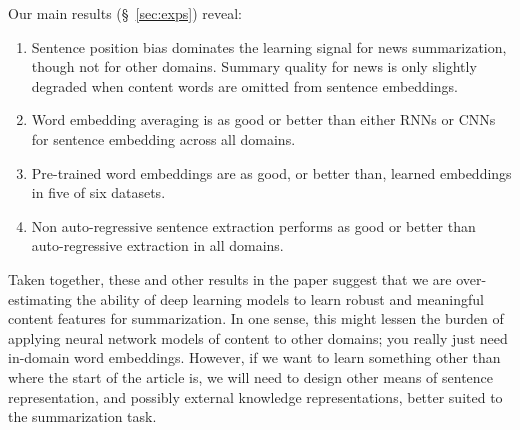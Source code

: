 \noindent
Our main results (\S~\ref{sec:exps}) reveal:
\begin{enumerate}
\item Sentence position bias dominates the learning signal for news summarization, though not for
other domains. %
Summary quality for news is only slightly degraded when content words
are omitted from sentence embeddings. %
\item Word embedding averaging is as good or better than either RNNs or CNNs for sentence embedding across all domains.
\item Pre-trained word embeddings are as good, or better than, learned embeddings in five of six datasets.%
\item Non auto-regressive sentence extraction performs as good or better 
     than auto-regressive extraction in all
    domains.
\end{enumerate} 

%
%


Taken together, these and other results in the paper suggest that we are 
over-estimating the ability of deep learning models to learn robust and 
meaningful content features for summarization.  
In one sense, this might lessen the burden of applying neural network models
of  content to other domains; you really just need in-domain word embeddings.
However, if we want to learn something other than where the start of 
the article is, we will need to design other means of sentence representation,
and possibly external knowledge representations, better suited to the summarization task.



